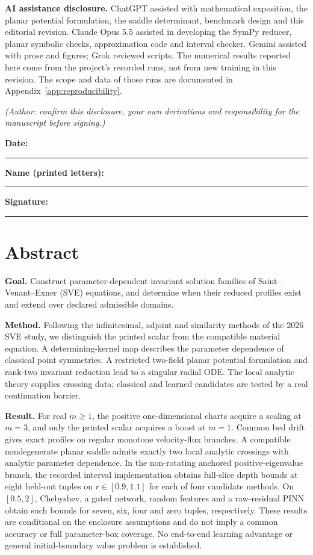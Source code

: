 \documentclass[12pt,a4paper,oneside]{report}
\newcommand{\authornote}[1]{\textcolor{authorblue}{\textit{(#1)}}}
\numberwithin{equation}{chapter}
\theoremstyle{definition}
\theoremstyle{remark}\newtheorem{remark}[theorem]{Remark}
\newif\ifreviewmarks
\DeclareRobustCommand{\review}[1]{{\ifreviewmarks\color{authorblue}\fi #1}}
\begin{document}
\bigskip
\noindent\textbf{AI assistance disclosure.}
\review{ChatGPT assisted with mathematical exposition, the planar potential formulation, the saddle determinant, benchmark design and this editorial revision. Claude Opus 5.5 assisted in developing the SymPy reducer, planar symbolic checks, approximation code and interval checker. Gemini assisted with prose and figures; Grok reviewed scripts. The numerical results reported here come from the project's recorded runs, not from new training in this revision. The scope and data of those runs are documented in Appendix~\ref{app:reproducibility}.}

\authornote{Author: confirm this disclosure, your own derivations and responsibility for the manuscript before signing.}

\vfill
\noindent\textbf{Date:} \rule[-8pt]{11.5cm}{0.1em}

\bigskip
\noindent\textbf{Name (printed letters):} \rule[-8pt]{7.8cm}{0.1em}

\bigskip
\noindent\textbf{Signature:} \rule[-8pt]{10.55cm}{0.1em}

\clearpage

\chapter*{Abstract}
\noindent\textbf{Goal.} \review{Construct parameter-dependent invariant solution families of Saint--Venant--Exner (SVE) equations, and determine when their reduced profiles exist and extend over declared admissible domains.}

\medskip\noindent\textbf{Method.} \review{Following the infinitesimal, adjoint and similarity methods of the 2026 SVE study, we distinguish the printed scalar from the compatible material equation. A determining-kernel map describes the parameter dependence of classical point symmetries. A restricted two-field planar potential formulation and rank-two invariant reduction lead to a singular radial ODE. The local analytic theory supplies crossing data; classical and learned candidates are tested by a real continuation barrier.}

\medskip\noindent\textbf{Result.} \review{For real $m\ge1$, the positive one-dimensional charts acquire a scaling at $m=3$, and only the printed scalar acquires a boost at $m=1$. Common bed drift gives exact profiles on regular monotone velocity-flux branches. A compatible nondegenerate planar saddle admits exactly two local analytic crossings with analytic parameter dependence. In the non-rotating anchored positive-eigenvalue branch, the recorded interval implementation obtains full-slice depth bounds at eight held-out tuples on $r\in[0.9,1.1]$ for each of four candidate methods. On $[0.5,2]$, Chebyshev, a gated network, random features and a raw-residual PINN obtain such bounds for seven, six, four and zero tuples, respectively. These results are conditional on the enclosure assumptions and do not imply a common accuracy or full parameter-box coverage. No end-to-end learning advantage or general initial-boundary value problem is established.}
\end{document}
